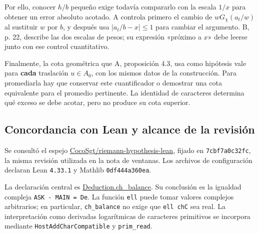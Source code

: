 Por ello, conocer $h/b$ pequeño exige todavía compararlo con la escala $1/x$ para obtener un error absoluto acotado. A controla primero el cambio de $wG_\chi(a_t/w)$ al sustituir $w$ por $b$, y después usa $|a_t/b-x|\le1$ para cambiar el argumento. B, p. 22, describe las dos escalas de pesos; su expresión «próximo a $x$» debe leerse junto con ese control cuantitativo.

Finalmente, la cota geométrica que A, proposición 4.3, usa como hipótesis vale para \textbf{cada} traslación $u\in A_0$, con los mismos datos de la construcción. Para promediarla hay que conservar este cuantificador o demostrar una cota equivalente para el promedio pertinente. La identidad de caracteres determina qué exceso se debe acotar, pero no produce su cota superior.

\subsection{Concordancia con Lean y alcance de la revisión}
\begingroup
\small
\raggedright

Se consultó el espejo \href{https://github.com/CocoSgt/riemann-hypothesis-lean/tree/7cbf7a0c32fca1badf05931879a37c3f8a2b03b4}{CocoSgt/riemann-hypothesis-lean}, fijado en \texttt{7cbf7a0c32fc}, la misma revisión utilizada en la nota de ventanas. Los archivos de configuración declaran Lean \texttt{4.33.1} y Mathlib \texttt{0df444a360ea}.

La declaración central es \href{https://github.com/CocoSgt/riemann-hypothesis-lean/blob/7cbf7a0c32fca1badf05931879a37c3f8a2b03b4/src/Development/AutomorphicArithmetic/DedekindLFunctions/LandauTheorems/ChBalance.lean}{Deduction.ch\_balance}. Su conclusión es la igualdad compleja \texttt{ASK - MAIN = De}. La función \texttt{ell} puede tomar valores complejos arbitrarios; en particular, \texttt{ch\_balance} no exige que \texttt{ell chC} sea real. La interpretación como derivadas logarítmicas de caracteres primitivos se incorpora mediante \texttt{HostAddCharCompatible} y \texttt{prim\_read}.

